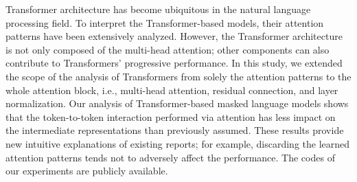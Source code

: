 Transformer architecture has become ubiquitous in the natural language processing field. To interpret the Transformer-based models, their attention patterns have been extensively analyzed. However, the Transformer architecture is not only composed of the multi-head attention; other components can also contribute to Transformers' progressive performance.  In this study, we extended the scope of the analysis of Transformers from solely the attention patterns to the whole attention block, i.e., multi-head attention, residual connection, and layer normalization. Our analysis of Transformer-based masked language models shows that the token-to-token interaction performed via attention has less impact on the intermediate representations than previously assumed. These results provide new intuitive explanations of existing reports; for example, discarding the learned attention patterns tends not to adversely affect the performance. The codes of our experiments are publicly available.
